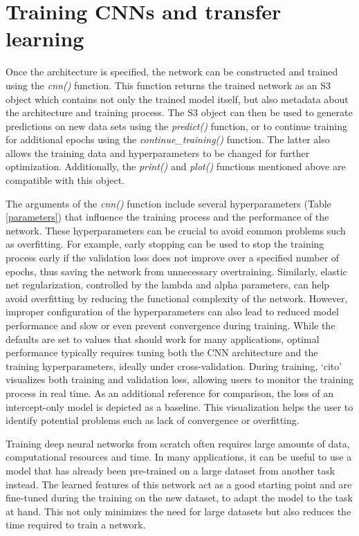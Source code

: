 \documentclass[12pt,twoside]{scrreport}
\newcommand{\pkg}[1]{`#1'}
\newcommand{\fn}[2][]{\textit{#2(}#1\textit{)}}
\begin{document}
\section*{Training CNNs and transfer learning}
Once the architecture is specified, the network can be constructed and trained using the \fn{cnn} function. This function returns the trained network as an S3 object which contains not only the trained model itself, but also metadata about the architecture and training process. The S3 object can then be used to generate predictions on new data sets using the \fn{predict} function, or to continue training for additional epochs using the \fn{continue\_training} function. The latter also allows the training data and hyperparameters to be changed for further optimization. Additionally, the \fn{print} and \fn{plot} functions mentioned above are compatible with this object.

The arguments of the \fn{cnn} function include several hyperparameters (Table \ref{parameters}) that influence the training process and the performance of the network. These hyperparameters can be crucial to avoid common problems such as overfitting. For example, early stopping can be used to stop the training process early if the validation loss does not improve over a specified number of epochs, thus saving the network from unnecessary overtraining. Similarly, elastic net regularization, controlled by the lambda and alpha parameters, can help avoid overfitting by reducing the functional complexity of the network. However, improper configuration of the hyperparameters can also lead to reduced model performance and slow or even prevent convergence during training. While the defaults are set to values that should work for many applications, optimal performance typically requires tuning both the CNN architecture and the training hyperparameters, ideally under cross-validation. During training, \pkg{cito} visualizes both training and validation loss, allowing users to monitor the training process in real time. As an additional reference for comparison, the loss of an intercept-only model is depicted as a baseline. This visualization helps the user to identify potential problems such as lack of convergence or overfitting.

Training deep neural networks from scratch often requires large amounts of data, computational resources and time. In many applications, it can be useful to use a model that has already  been pre-trained on a large dataset from another task instead. The learned features of this network act as a good starting point and are fine-tuned during the training on the new dataset, to adapt the model to the task at hand. This not only minimizes the need for large datasets but also reduces the time required to train a network.
\end{document}
